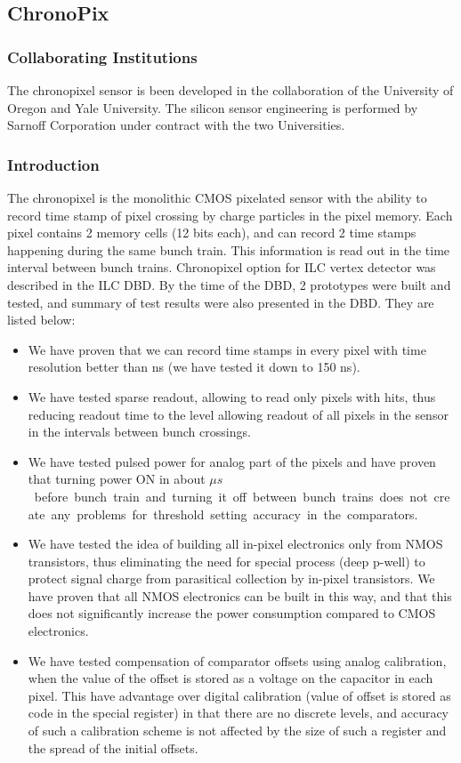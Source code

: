 \subsection{ChronoPix}
\subsubsection{Collaborating Institutions}
    The chronopixel sensor is been developed in the collaboration of the University of Oregon and Yale University. The silicon sensor engineering is performed by Sarnoff Corporation under contract with the two Universities.

\subsubsection{Introduction}
The chronopixel is the monolithic CMOS pixelated sensor with the ability to record time stamp of pixel crossing by charge particles in the pixel memory. Each pixel contains 2 memory cells (12 bits each), and can record 2 time stamps happening during the same bunch train. This information is read out in the time interval between bunch trains. Chronopixel option for ILC vertex detector was described in the ILC DBD. By the time of the DBD, 2 prototypes were built and tested, and summary of test results were also presented in the DBD. They are listed below: 
\begin{itemize}
    \item We have proven that we can record time stamps in every pixel with time resolution better than \unit[300]{ns} (we have tested it down to 150 ns).
    \item We have tested sparse readout, allowing to read only pixels with hits, thus reducing readout time to the level allowing readout of all pixels in the sensor in the intervals between bunch crossings.
    \item We have tested pulsed power for analog part of the pixels and have proven that turning power ON in about \unit[100]{$\mu s$} before bunch train and turning it off between bunch trains does not create any problems for threshold setting accuracy in the comparators.
    \item We have tested the idea of building all in-pixel electronics only from NMOS transistors, thus eliminating the need for special process (deep p-well) to protect signal charge from parasitical collection by in-pixel transistors. We have proven that all NMOS electronics can be built in this way, and that this does not significantly increase the power consumption compared to CMOS electronics.
    \item We have tested compensation of comparator offsets using analog calibration, when the value of the offset is stored as a voltage on the capacitor in each pixel. This have advantage over digital calibration (value of offset is stored as code in the special register) in that there are no discrete levels, and accuracy of such a calibration scheme is not affected by the size of such a register and the spread of the initial offsets.
\end{itemize}
